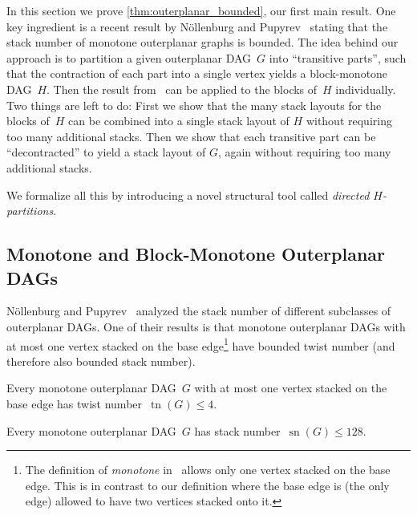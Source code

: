 \documentclass{theoretics}
\DeclareMathOperator{\sn}{sn}
\DeclareMathOperator{\tn}{tn}
\newcommand{\Hpartition}{$H$\nobreakdash-partition\xspace}
\begin{document}
In this section we prove \cref{thm:outerplanar_bounded}, our first main result.
One key ingredient is a recent result by N\"{o}llenburg and Pupyrev~\cite{Noellenburg2021_DAGsWithConstantStackNumber} stating that the stack number of monotone outerplanar graphs is bounded.
The idea behind our approach is to partition a given outerplanar DAG~$G$ into \enquote{transitive parts}, such that the contraction of each part into a single vertex yields a block-monotone DAG~$H$.
Then the result from~\cite{Noellenburg2021_DAGsWithConstantStackNumber} can be applied to the blocks of~$H$ individually.
Two things are left to do:
First we show that the many stack layouts for the blocks of~$H$ can be combined into a single stack layout of $H$ without requiring too many additional stacks.
Then we show that each transitive part can be \enquote{decontracted} to yield a stack layout of $G$, again without requiring too many additional stacks.

We formalize all this by introducing a novel structural tool called \emph{directed \Hpartition{}s}.

\subsection{Monotone and Block-Monotone Outerplanar DAGs}

N\"{o}llenburg and Pupyrev~\cite{Noellenburg2021_DAGsWithConstantStackNumber} analyzed the stack number of different subclasses of outerplanar DAGs.
One of their results is that monotone outerplanar DAGs with at most one vertex stacked on the base edge\footnote{
    The definition of \emph{monotone} in~\cite{Noellenburg2021_DAGsWithConstantStackNumber} allows only one vertex stacked on the base edge.
    This is in contrast to our definition where the base edge is (the only edge) allowed to have two vertices stacked onto it.
} have bounded twist number (and therefore also bounded stack number).

\begin{theorem}
    \label{thm:monotone_outerplanar_twist_4}
    Every monotone outerplanar DAG~$G$ with at most one vertex stacked on the base edge has twist number~$\tn(G) \leq 4$.
\end{theorem}

\begin{corollary}
    \label{cor:monotone_outerplanar_stack_128}
    Every monotone outerplanar DAG~$G$ has stack number~$\sn(G) \leq 128$.
\end{corollary}
\end{document}
